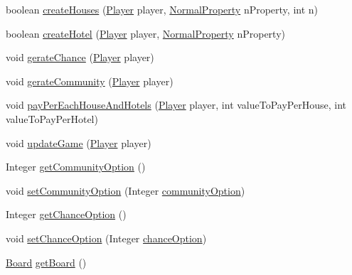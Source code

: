 \begin{DoxyCompactItemize}
\item 
boolean \hyperlink{class_monopoly_1_1_logic_1_1_game_a5479f87d1b5b5cf67107b80de56beba8}{create\+Houses} (\hyperlink{class_monopoly_1_1_logic_1_1_player}{Player} player, \hyperlink{class_monopoly_1_1_logic_1_1_normal_property}{Normal\+Property} n\+Property, int n)
\item 
boolean \hyperlink{class_monopoly_1_1_logic_1_1_game_ac106efb395439c6fa0b8f6e3749415b9}{create\+Hotel} (\hyperlink{class_monopoly_1_1_logic_1_1_player}{Player} player, \hyperlink{class_monopoly_1_1_logic_1_1_normal_property}{Normal\+Property} n\+Property)
\item 
void \hyperlink{class_monopoly_1_1_logic_1_1_game_af9d00f09d3612c52c7980710713fed21}{gerate\+Chance} (\hyperlink{class_monopoly_1_1_logic_1_1_player}{Player} player)
\item 
void \hyperlink{class_monopoly_1_1_logic_1_1_game_a14e8a8bc2aca1c01df75051511c7cc7b}{gerate\+Community} (\hyperlink{class_monopoly_1_1_logic_1_1_player}{Player} player)
\item 
void \hyperlink{class_monopoly_1_1_logic_1_1_game_a54ac92c333ef0c7c963df44bac9f8506}{pay\+Per\+Each\+House\+And\+Hotels} (\hyperlink{class_monopoly_1_1_logic_1_1_player}{Player} player, int value\+To\+Pay\+Per\+House, int value\+To\+Pay\+Per\+Hotel)
\item 
void \hyperlink{class_monopoly_1_1_logic_1_1_game_a62c4db7a3d1986bdd2e8f8b2938a5d63}{update\+Game} (\hyperlink{class_monopoly_1_1_logic_1_1_player}{Player} player)
\item 
Integer \hyperlink{class_monopoly_1_1_logic_1_1_game_a360b16bdaea39cbbcae7a317b20c44c0}{get\+Community\+Option} ()
\item 
void \hyperlink{class_monopoly_1_1_logic_1_1_game_ac21ca645765f0c387a86b8294eaac8d8}{set\+Community\+Option} (Integer \hyperlink{class_monopoly_1_1_logic_1_1_game_af554ecfbf29629088223f2b39fd30957}{community\+Option})
\item 
Integer \hyperlink{class_monopoly_1_1_logic_1_1_game_a12cdb08d22a6f78a80aa06bf4c98a8ad}{get\+Chance\+Option} ()
\item 
void \hyperlink{class_monopoly_1_1_logic_1_1_game_a0a4fe65f77786ddee21709784b422b0a}{set\+Chance\+Option} (Integer \hyperlink{class_monopoly_1_1_logic_1_1_game_a31a86909fac3b9813f640e1bde0dca67}{chance\+Option})
\item 
\hyperlink{class_monopoly_1_1_logic_1_1_board}{Board} \hyperlink{class_monopoly_1_1_logic_1_1_game_a01038718bb0a616035e99f9130f29b05}{get\+Board} ()
\end{DoxyCompactItemize}
